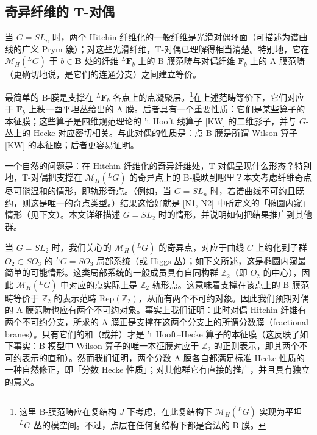 \documentclass[11pt,a4paper]{article}
\begin{document}

\subsection{奇异纤维的 T-对偶}

当 $G=SL_n$ 时，两个 Hitchin 纤维化的一般纤维是光滑对偶环面（可描述为谱曲线的广义 Prym 簇）；对这些光滑纤维，T-对偶已理解得相当清楚。特别地，它在 $\mathcal{M}_H({}^{L}G)$ 于 $b\in\boldsymbol{B}$ 处的纤维 ${}^{L}\boldsymbol{F}_b$ 上的 B-膜范畴与对偶纤维 $\boldsymbol{F}_b$ 上的 A-膜范畴（更确切地说，是它们的连通分支）之间建立等价。

最简单的 B-膜是支撑在 ${}^{L}\boldsymbol{F}_b$ 各点上的点凝聚层。\footnote{这里 B-膜范畴应在复结构 $J$ 下考虑，在此复结构下 $\mathcal{M}_H({}^{L}G)$ 实现为平坦 ${}^{L}G$-丛的模空间。不过，点层在任何复结构下都是合法的 B-膜。}在上述范畴等价下，它们对应于 $\boldsymbol{F}_b$ 上秩一酉平坦丛给出的 A-膜。后者具有一个重要性质：它们是某些算子的本征膜；这些算子是四维规范理论的 't Hooft 线算子 [KW] 的二维影子，并与 $G$-丛上的 Hecke 对应密切相关。与此对偶的性质是：点 B-膜是所谓 Wilson 算子 [KW] 的本征膜；后者更容易证明。

一个自然的问题是：在 Hitchin 纤维化的奇异纤维处，T-对偶呈现什么形态？特别地，T-对偶把支撑在 $\mathcal{M}_H({}^{L}G)$ 的奇异点上的 B-膜映到哪里？本文考虑纤维奇点尽可能温和的情形，即轨形奇点。（例如，当 $G=SL_n$ 时，若谱曲线不可约且既约，则这是唯一的奇点类型。）结果这恰好就是 [N1, N2] 中所定义的「椭圆内窥」情形（见下文）。本文详细描述 $G=SL_2$ 时的情形，并说明如何把结果推广到其他群。

当 $G=SL_2$ 时，我们关心的 $\mathcal{M}_H({}^{L}G)$ 的奇异点，对应于曲线 $C$ 上约化到子群 $O_2\subset SO_3$ 的 ${}^{L}G=SO_3$ 局部系统（或 Higgs 丛）；如下文所述，这是椭圆内窥最简单的可能情形。这类局部系统的一般成员具有自同构群 $\mathbb{Z}_2$（即 $O_2$ 的中心），因此 $\mathcal{M}_H({}^{L}G)$ 中对应的点实际上是 $\mathbb{Z}_2$-轨形点。这意味着支撑在该点上的 B-膜范畴等价于 $\mathbb{Z}_2$ 的表示范畴 $\mathrm{Rep}(\mathbb{Z}_2)$，从而有两个不可约对象。因此我们预期对偶的 A-膜范畴也应有两个不可约对象。事实上我们证明：此时对偶 Hitchin 纤维有两个不可约分支，所求的 A-膜正是支撑在这两个分支上的所谓分数膜（fractional branes）。只有它们的和（或并）才是 't Hooft--Hecke 算子的本征膜（这反映了如下事实：B-模型中 Wilson 算子的唯一本征膜对应于 $\mathbb{Z}_2$ 的正则表示，即其两个不可约表示的直和）。然而我们证明，两个分数 A-膜各自都满足标准 Hecke 性质的一种自然修正，即「分数 Hecke 性质」；对其他群它有直接的推广，并且具有独立的意义。
\end{document}
